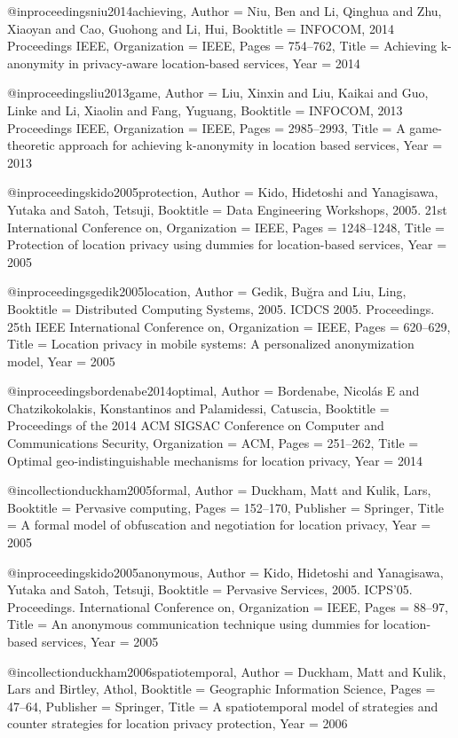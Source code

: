 {{{{{	@inproceedings{niu2014achieving,
	Author = {Niu, Ben and Li, Qinghua and Zhu, Xiaoyan and Cao, Guohong and Li, Hui},
	Booktitle = {INFOCOM, 2014 Proceedings IEEE},
	Organization = {IEEE},
	Pages = {754--762},
	Title = {Achieving k-anonymity in privacy-aware location-based services},
	Year = {2014}}
	
	@inproceedings{liu2013game,
	Author = {Liu, Xinxin and Liu, Kaikai and Guo, Linke and Li, Xiaolin and Fang, Yuguang},
	Booktitle = {INFOCOM, 2013 Proceedings IEEE},
	Organization = {IEEE},
	Pages = {2985--2993},
	Title = {A game-theoretic approach for achieving k-anonymity in location based services},
	Year = {2013}}
	
	@inproceedings{kido2005protection,
	Author = {Kido, Hidetoshi and Yanagisawa, Yutaka and Satoh, Tetsuji},
	Booktitle = {Data Engineering Workshops, 2005. 21st International Conference on},
	Organization = {IEEE},
	Pages = {1248--1248},
	Title = {Protection of location privacy using dummies for location-based services},
	Year = {2005}}
	
	@inproceedings{gedik2005location,
	Author = {Gedik, Bu{\u{g}}ra and Liu, Ling},
	Booktitle = {Distributed Computing Systems, 2005. ICDCS 2005. Proceedings. 25th IEEE International Conference on},
	Organization = {IEEE},
	Pages = {620--629},
	Title = {Location privacy in mobile systems: A personalized anonymization model},
	Year = {2005}}
	
	@inproceedings{bordenabe2014optimal,
	Author = {Bordenabe, Nicol{\'a}s E and Chatzikokolakis, Konstantinos and Palamidessi, Catuscia},
	Booktitle = {Proceedings of the 2014 ACM SIGSAC Conference on Computer and Communications Security},
	Organization = {ACM},
	Pages = {251--262},
	Title = {Optimal geo-indistinguishable mechanisms for location privacy},
	Year = {2014}}
	
	@incollection{duckham2005formal,
	Author = {Duckham, Matt and Kulik, Lars},
	Booktitle = {Pervasive computing},
	Pages = {152--170},
	Publisher = {Springer},
	Title = {A formal model of obfuscation and negotiation for location privacy},
	Year = {2005}}
	
	@inproceedings{kido2005anonymous,
	Author = {Kido, Hidetoshi and Yanagisawa, Yutaka and Satoh, Tetsuji},
	Booktitle = {Pervasive Services, 2005. ICPS'05. Proceedings. International Conference on},
	Organization = {IEEE},
	Pages = {88--97},
	Title = {An anonymous communication technique using dummies for location-based services},
	Year = {2005}}
	
	@incollection{duckham2006spatiotemporal,
	Author = {Duckham, Matt and Kulik, Lars and Birtley, Athol},
	Booktitle = {Geographic Information Science},
	Pages = {47--64},
	Publisher = {Springer},
	Title = {A spatiotemporal model of strategies and counter strategies for location privacy protection},
	Year = {2006}}
	
}}}}}
